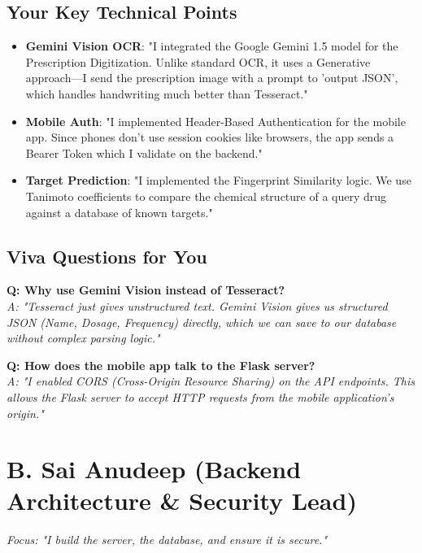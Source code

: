 \documentclass[a4paper,11pt]{report}
\begin{document}
\section{Your Key Technical Points}
\begin{itemize}
    \item \textbf{Gemini Vision OCR}: "I integrated the Google Gemini 1.5 model for the Prescription Digitization. Unlike standard OCR, it uses a Generative approach—I send the prescription image with a prompt to 'output JSON', which handles handwriting much better than Tesseract."
    \item \textbf{Mobile Auth}: "I implemented Header-Based Authentication for the mobile app. Since phones don't use session cookies like browsers, the app sends a Bearer Token which I validate on the backend."
    \item \textbf{Target Prediction}: "I implemented the Fingerprint Similarity logic. We use Tanimoto coefficients to compare the chemical structure of a query drug against a database of known targets."
\end{itemize}

\section{Viva Questions for You}
\textbf{Q: Why use Gemini Vision instead of Tesseract?} \\
\textit{A: "Tesseract just gives unstructured text. Gemini Vision gives us structured JSON (Name, Dosage, Frequency) directly, which we can save to our database without complex parsing logic."}

\textbf{Q: How does the mobile app talk to the Flask server?} \\
\textit{A: "I enabled CORS (Cross-Origin Resource Sharing) on the API endpoints. This allows the Flask server to accept HTTP requests from the mobile application's origin."}

\newpage

\chapter{B. Sai Anudeep (Backend Architecture \& Security Lead)}
\textit{Focus: "I build the server, the database, and ensure it is secure."}
\end{document}
